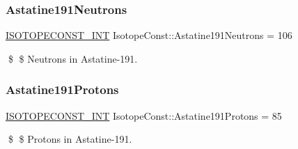 \subsubsection{\texorpdfstring{Astatine191\+Neutrons}{Astatine191Neutrons}}
{\footnotesize\ttfamily \mbox{\hyperlink{group___isotope_const-_macros_ga5f18360b3e99483a35c32d789e62621c}{I\+S\+O\+T\+O\+P\+E\+C\+O\+N\+S\+T\+\_\+\+I\+NT}} Isotope\+Const\+::\+Astatine191\+Neutrons = 106}

\$ \$ Neutrons in Astatine-\/191. \mbox{\label{group___isotope_const-_astatine-_at191_ga8c1d738bdc8ee9935a2d9777047d5bf4}} 
\subsubsection{\texorpdfstring{Astatine191\+Protons}{Astatine191Protons}}
{\footnotesize\ttfamily \mbox{\hyperlink{group___isotope_const-_macros_ga5f18360b3e99483a35c32d789e62621c}{I\+S\+O\+T\+O\+P\+E\+C\+O\+N\+S\+T\+\_\+\+I\+NT}} Isotope\+Const\+::\+Astatine191\+Protons = 85}

\$ \$ Protons in Astatine-\/191. 